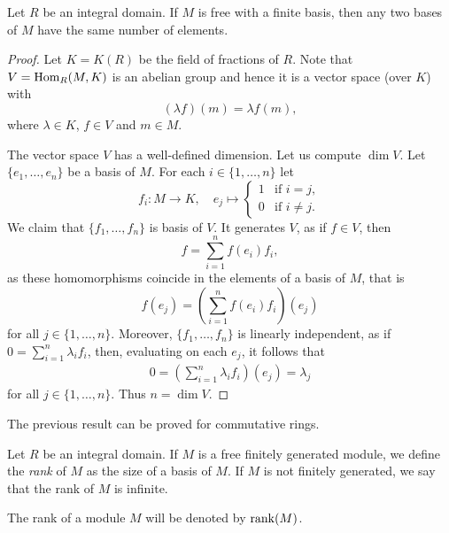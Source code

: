 \begin{theorem}
Let $R$ be an integral domain. If $M$ is free with a finite basis, then 
any two bases of $M$ have the same number of elements.
\end{theorem}

\begin{proof}
Let $K=K(R)$ be the field of fractions of $R$. Note that 
$V=\operatorname{Hom}_R(M,K)$ is an abelian group and hence it 
is a vector space (over $K$) with 
\[
(\lambda f)(m)=\lambda f(m),
\]
where $\lambda\in K$, $f\in V$ and $m\in M$.

The vector space $V$ has a well-defined dimension. 
Let us compute $\dim V$. Let $\{e_1,\dots,e_n\}$ be a basis of $M$. 
For each $i\in\{1,\dots,n\}$ let 
\[
f_i\colon M\to K,\quad
e_j\mapsto\begin{cases}
1 & \text{if $i=j$},\\
0 & \text{if $i\ne j$}.
\end{cases}
\]
We claim that $\{f_1,\dots,f_n\}$ is basis of  $V$. It generates $V$, as  
if $f\in V$, then 
\[
f=\sum_{i=1}^n f(e_i)f_i,
\]
as these homomorphisms coincide in the elements of a basis of $M$, that is 
\[
f(e_j)=(\sum_{i=1}^n f(e_i)f_i)(e_j)
\]
for all $j\in\{1,\dots,n\}$.    
Moreover, $\{f_1,\dots,f_n\}$ is linearly independent, as if $0=\sum_{i=1}^n\lambda_if_i$, 
then, evaluating on each $e_j$, it follows that 
\begin{align*}
0=\left(\sum_{i=1}^n \lambda_if_i\right)(e_j)=\lambda_j
\end{align*}
for all $j\in\{1,\dots,n\}$. Thus $n=\dim V$. 
\end{proof}

The previous result can be proved for commutative rings. 

\begin{definition}
Let $R$ be an integral domain. If $M$ is a free 
finitely generated module, we define
the \emph{rank} of $M$ as the size of a basis of $M$. If $M$ is not finitely generated, 
we say that the rank of $M$ is infinite. 
\end{definition}

The rank of a module $M$ will be denoted by $\operatorname{rank}(M)$.   
